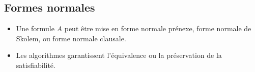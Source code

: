 \documentclass{article}
\begin{document}
\subsection*{Formes normales}
\begin{itemize}
    \item Une formule $A$ peut être mise en forme normale prénexe, forme normale de Skolem, ou forme normale clausale.
    \item Les algorithmes garantissent l'équivalence ou la préservation de la satisfiabilité.
\end{itemize}
\end{document}

